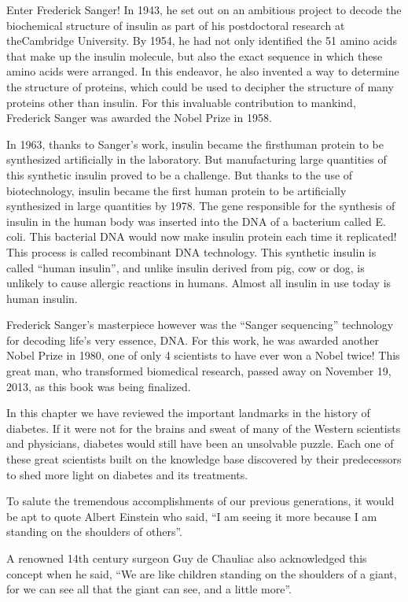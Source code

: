 Enter Frederick Sanger! In 1943, he set out on an ambitious project to decode the biochemical structure of insulin as part of his postdoctoral research at the\break Cambridge University. By 1954, he had not only identified the 51 amino acids that make up the insulin molecule, but also the exact sequence in which these amino acids were arranged. In this endeavor, he also invented a way to determine the structure of proteins, which could be used to decipher the structure of many proteins other than insulin. For this invaluable contribution to mankind, Frederick Sanger was awarded the Nobel Prize in 1958.

In 1963, thanks to Sanger’s work, insulin became the first\break human protein to be synthesized artificially in the laboratory. But manufacturing large quantities of this synthetic insulin proved to be a challenge. But thanks to the use of biotechnology, insulin became the first human protein to be artificially synthesized in large quantities by 1978. The gene responsible for the synthesis of insulin in the human body was inserted into the DNA of a bacterium called E. coli. This bacterial DNA would now make insulin protein each time it replicated! This process is called recombinant DNA technology. This synthetic insu\-lin is called “human insulin”, and unlike insulin derived from pig, cow or dog, is unlikely to cause allergic reactions in humans. Almost all insu\-lin in use today is human insulin.

Frederick Sanger’s masterpiece however was the “Sanger sequen\-cing” technology for decoding life’s very essence, DNA. For this work, he was awarded another Nobel Prize in 1980, one of only 4 scientists to have ever won a Nobel twice! This great man, who transformed biomedical research, passed away on November 19, 2013, as this book was being finalized.

In this chapter we have reviewed the important landmarks in the history of diabetes. If it were not for the brains and sweat of many of the Western scientists and physicians, diabetes would still have been an unsolvable puzzle. Each one of these great scientists built on the knowledge base discovered by their predecessors to shed more light on diabetes and its treatments.

To salute the tremendous accomplishments of our previous genera\-tions, it would be apt to quote Albert Einstein who said, “I am seeing it more because I am standing on the shoulders of others”.

A renowned 14th century surgeon Guy de Chauliac also acknow\-ledged this concept when he said, “We are like children standing on the shoulders of a giant, for we can see all that the giant can see, and a little more”.

